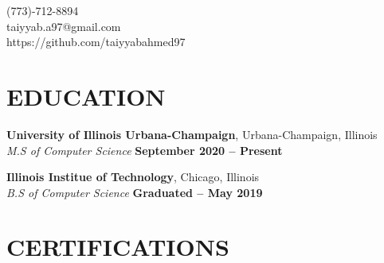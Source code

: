 \documentclass[margin,line]{resume}
\begin{document}
{
    \hfill (773)-712-8894       \vspace{0mm}\\\vspace{0mm}%
    \hfill taiyyab.a97@gmail.com           \vspace{0mm}\\\vspace{0mm}%
    \hfill https://github.com/taiyyabahmed97 \vspace{0mm}\\\vspace{-9mm}%
}

\begin{resume}

    \vspace{-3mm}


    \vspace{-1mm}



    \section{\mysidestyle \textbf{\large{E}\small{DUCATION}}}

    \textbf{\listing University of Illinois Urbana-Champaign}, Urbana-Champaign, Illinois \vspace{1mm}\\
    \textsl{M.S of Computer Science} \hfill \textbf{September 2020 -- Present}\vspace{-3mm}\\\vspace{-1mm}%

    \textbf{\listing Illinois Institue of Technology}, Chicago, Illinois \vspace{1mm}\\
    \textsl{B.S of Computer Science}  \hfill \textbf{Graduated -- May 2019}\vspace{-3mm}\\\vspace{-1mm}%

    \vspace{-1mm}

    \section{\mysidestyle \textbf{\large{C}\small{ERTIFICATIONS}}}


\end{resume}
\end{document}

